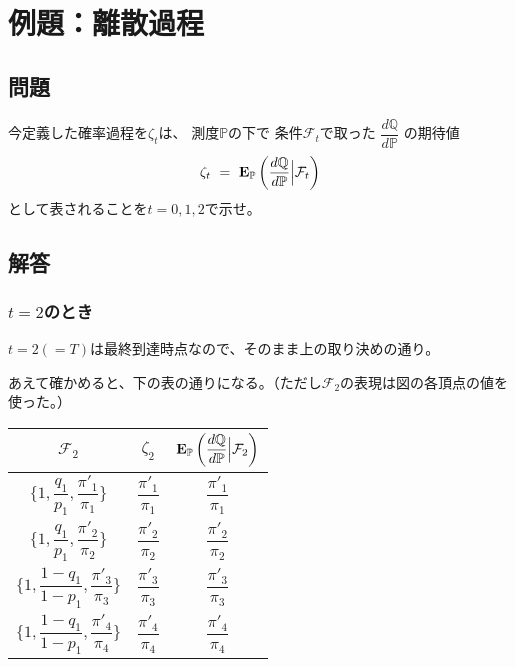 \documentclass[uplatex,a4j,12pt,dvipdfmx]{jsarticle}
\begin{document}
\section{例題：離散過程}

\subsection{問題}

今定義した確率過程を$\zeta_{t}$は、
測度$\mathbb{P}$の下で
条件$\mathcal{F}_{t}$で取った
$\dfrac{ d \mathbb{Q} }{ d \mathbb{P} }$
の期待値
$$
	\zeta_{t}
	\ = \
	{\bf E}_{\mathbb{P}}
	\left( \dfrac{ d \mathbb{Q} }{ d \mathbb{P} } \Big| \mathcal{F}_{t} \right)
$$
として表されることを$t=0,1,2$で示せ。
\subsection{解答}
\subsubsection{$t=2$のとき}

$t=2(=T)$は最終到達時点なので、そのまま上の取り決めの通り。

あえて確かめると、下の表の通りになる。（ただし$\mathcal{F}_{2}$の表現は図の各頂点の値を使った。）

\begin{center}
	\begin{tabular}{|c|c|c|} \hline
		$\mathcal{F}_{2}$                                                             & $\zeta_{2}$                     & ${\bf E}_{\mathbb{P}} \left( \dfrac{ d \mathbb{Q} }{ d \mathbb{P} } \Big| \mathcal{F}_{2} \right)$ \\ \hline \hline
		$\Big\{ 1 , \dfrac{q_{1}}{p_{1}} , \dfrac{ \pi'_{1} }{ \pi_{1} } \Big\} $     & $\dfrac{ \pi'_{1} }{ \pi_{1} }$ & $\dfrac{ \pi'_{1} }{ \pi_{1} }$                                                                    \\ \hline
		$\Big\{ 1 , \dfrac{q_{1}}{p_{1}} , \dfrac{ \pi'_{2} }{ \pi_{2} } \Big\} $     & $\dfrac{ \pi'_{2} }{ \pi_{2} }$ & $\dfrac{ \pi'_{2} }{ \pi_{2} }$                                                                    \\ \hline
		$\Big\{ 1 , \dfrac{1-q_{1}}{1-p_{1}} , \dfrac{ \pi'_{3} }{ \pi_{3} } \Big\} $ & $\dfrac{ \pi'_{3} }{ \pi_{3} }$ & $\dfrac{ \pi'_{3} }{ \pi_{3} }$                                                                    \\ \hline
		$\Big\{ 1 , \dfrac{1-q_{1}}{1-p_{1}} , \dfrac{ \pi'_{4} }{ \pi_{4} } \Big\} $ & $\dfrac{ \pi'_{4} }{ \pi_{4} }$ & $\dfrac{ \pi'_{4} }{ \pi_{4} }$                                                                    \\ \hline
	\end{tabular}
\end{center}
\end{document}
